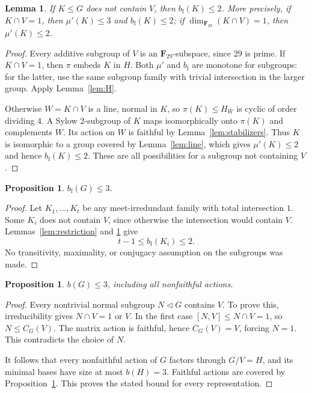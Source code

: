 \documentclass[11pt]{article}
\newtheorem{proposition}[theorem]{Proposition}
\newtheorem{lemma}[theorem]{Lemma}
\theoremstyle{remark}\newtheorem{remark}[theorem]{Remark}
\newcommand{\F}{\mathbf F}
\newcommand{\mup}{\mu'}
\newcommand{\bfth}{b_{\mathrm f}}
\begin{document}
\begin{lemma}\label{lem:properV}
If $K\le G$ does not contain $V$, then $\bfth(K)\le2$. More precisely, if
$K\cap V=1$, then $\mup(K)\le3$ and $\bfth(K)\le2$; if
$\dim_{\F_{29}}(K\cap V)=1$, then $\mup(K)\le2$.
\end{lemma}
\begin{proof}
Every additive subgroup of $V$ is an $\F_{29}$-subspace, since 29 is prime.
If $K\cap V=1$, then $\pi$ embeds $K$ in $H$. Both $\mup$ and $\bfth$ are
monotone for subgroups: for the latter, use the same subgroup family with
trivial intersection in the larger group. Apply Lemma~\ref{lem:H}.

Otherwise $W=K\cap V$ is a line, normal in $K$, so $\pi(K)\le H_W$ is cyclic
of order dividing 4. A Sylow 2-subgroup of $K$ maps isomorphically onto
$\pi(K)$ and complements $W$. Its action on $W$ is faithful by
Lemma~\ref{lem:stabilizers}. Thus $K$ is isomorphic to a group covered by
Lemma~\ref{lem:line}, which gives $\mup(K)\le2$ and hence $\bfth(K)\le2$.
These are all possibilities for a subgroup not containing $V$.
\end{proof}

\begin{proposition}\label{prop:faithful}
$\bfth(G)\le3$.
\end{proposition}
\begin{proof}
Let $K_1,\ldots,K_t$ be any meet-irredundant family with total intersection
$1$. Some $K_i$ does not contain $V$, since otherwise the intersection would
contain $V$. Lemmas~\ref{lem:restriction} and \ref{lem:properV} give
\[
                   t-1\le\bfth(K_i)\le2.
\]
No transitivity, maximality, or conjugacy assumption on the subgroups was made.
\end{proof}

\begin{proposition}\label{prop:allactions}
$b(G)\le3$, including all nonfaithful actions.
\end{proposition}
\begin{proof}
Every nontrivial normal subgroup $N\lhd G$ contains $V$. To prove this,
irreducibility gives $N\cap V=1$ or $V$. In the first case
$[N,V]\le N\cap V=1$, so $N\le C_G(V)$. The matrix action is faithful, hence
$C_G(V)=V$, forcing $N=1$. This contradicts the choice of $N$.

It follows that every nonfaithful action of $G$ factors through $G/V=H$,
and its minimal bases have size at most $b(H)=3$. Faithful actions are
covered by Proposition~\ref{prop:faithful}. This proves the stated bound
for every representation.
\end{proof}
\end{document}
